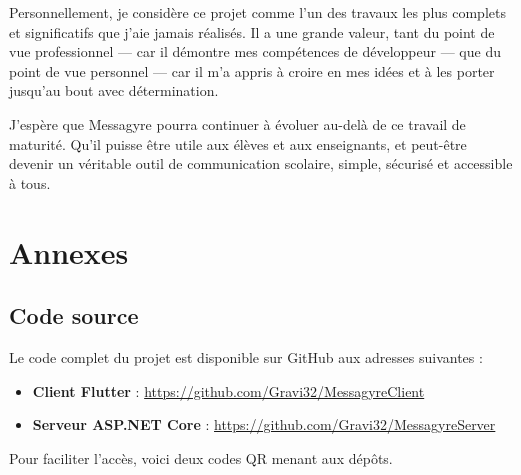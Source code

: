 \documentclass[12pt]{report}
\begin{document}
	Personnellement, je considère ce projet comme l’un des travaux les plus complets et significatifs que j’aie jamais réalisés. Il a une grande valeur, tant du point de vue professionnel — car il démontre mes compétences de développeur — que du point de vue personnel — car il m’a appris à croire en mes idées et à les porter jusqu’au bout avec détermination.
	
	J’espère que Messagyre pourra continuer à évoluer au-delà de ce travail de maturité. Qu’il puisse être utile aux élèves et aux enseignants, et peut-être devenir un véritable outil de communication scolaire, simple, sécurisé et accessible à tous.
	
	\chapter{Annexes}
	
	\section{Code source}
	
	Le code complet du projet est disponible sur GitHub aux adresses suivantes :
	
	\begin{itemize}
		\item \textbf{Client Flutter} : \url{https://github.com/Gravi32/MessagyreClient}
		\item \textbf{Serveur ASP.NET Core} : \url{https://github.com/Gravi32/MessagyreServer}
	\end{itemize}
	
	Pour faciliter l’accès, voici deux codes QR menant aux dépôts.
	
\end{document}
